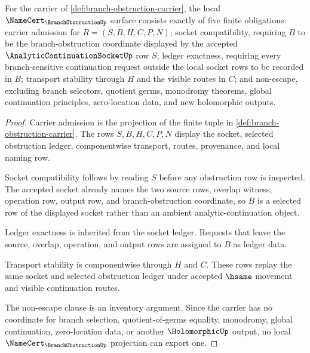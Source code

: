 \begin{theorem}
\label{thm:branch-obstruction-namecert-obligations}
For the carrier of \autoref{def:branch-obstruction-carrier}, the local $\NameCert_{\BranchObstructionUp}$ surface consists exactly of five finite obligations: carrier admission for $R=(S,B,H,C,P,N)$; socket compatibility, requiring $B$ to be the branch-obstruction coordinate displayed by the accepted $\AnalyticContinuationSocketUp$ row $S$; ledger exactness, requiring every branch-sensitive continuation request outside the local socket rows to be recorded in $B$; transport stability through $H$ and the visible routes in $C$; and non-escape, excluding branch selectors, quotient germs, monodromy theorems, global continuation principles, zero-location data, and new holomorphic outputs.
\end{theorem}
\begin{proof}
Carrier admission is the projection of the finite tuple in \autoref{def:branch-obstruction-carrier}. The rows $S,B,H,C,P,N$ display the socket, selected obstruction ledger, componentwise transport, routes, provenance, and local naming row.

Socket compatibility follows by reading $S$ before any obstruction row is inspected. The accepted socket already names the two source rows, overlap witness, operation row, output row, and branch-obstruction coordinate, so $B$ is a selected row of the displayed socket rather than an ambient analytic-continuation object.

Ledger exactness is inherited from the socket ledger. Requests that leave the source, overlap, operation, and output rows are assigned to $B$ as ledger data.

Transport stability is componentwise through $H$ and $C$. These rows replay the same socket and selected obstruction ledger under accepted $\hsame$ movement and visible continuation routes.

The non-escape clause is an inventory argument. Since the carrier has no coordinate for branch selection, quotient-of-germs equality, monodromy, global continuation, zero-location data, or another $\HolomorphicUp$ output, no local $\NameCert_{\BranchObstructionUp}$ projection can export one.
\end{proof}

